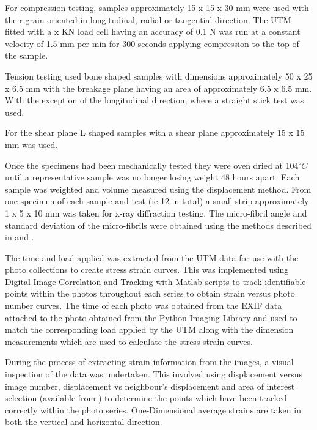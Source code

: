\documentclass[10pt]{article}
\begin{document}
For compression testing, samples approximately 15 x 15 x 30 mm were used with
their grain oriented in longitudinal, radial or tangential direction.
The UTM fitted with a x KN load cell having an accuracy of 0.1 N was run at a
constant velocity of 1.5 mm per min for 300 seconds applying compression to the
top of the sample.

Tension testing used bone shaped samples with dimensions approximately 50 x 25 x
6.5 mm with the breakage plane having an area of approximately 6.5 x 6.5 mm.
With the exception of the longitudinal direction, where a straight stick test was used.

For the shear plane L shaped samples with a shear plane approximately 15 x 15 mm
was used.

Once the specimens had been mechanically tested they were oven dried at 104\(^\circ C\) until a representative sample was no
longer losing weight 48 hours apart. Each sample was weighted and volume measured using the displacement method.
From one specimen of each sample and test (ie 12 in total) a small strip approximately 1 x 5 x 10 mm was taken for
x-ray diffraction testing. The micro-fibril angle and standard deviation of the micro-fibrils were obtained using the
methods described in \citet{cave_measuring_1998} and \citet{cave_interpretation_1998}.

The time and load applied was extracted from the UTM data for use with the photo collections to create stress strain curves.
This was implemented using Digital Image Correlation and Tracking with Matlab scripts
\citep{chris_eberl_robert_thompson_daniel_gianola_digital_2006} to track identifiable points within the photos throughout
each series to obtain strain  versus photo number curves. The time of each photo was obtained from the EXIF data attached
to the photo obtained from the Python Imaging Library \citep{lundh_python_1995} and used to match the corresponding
load applied by the UTM along with the dimension measurements which are used to calculate the stress strain curves.

During the process of extracting strain information from the images, a visual inspection of the data was undertaken.
This involved using displacement versus image number, displacement vs neighbour's displacement and area of interest selection
(available from \citet{chris_eberl_robert_thompson_daniel_gianola_digital_2006}) to determine the points which have been
tracked correctly within the photo series. One-Dimensional average strains are taken in both the vertical and horizontal direction.
\end{document}
